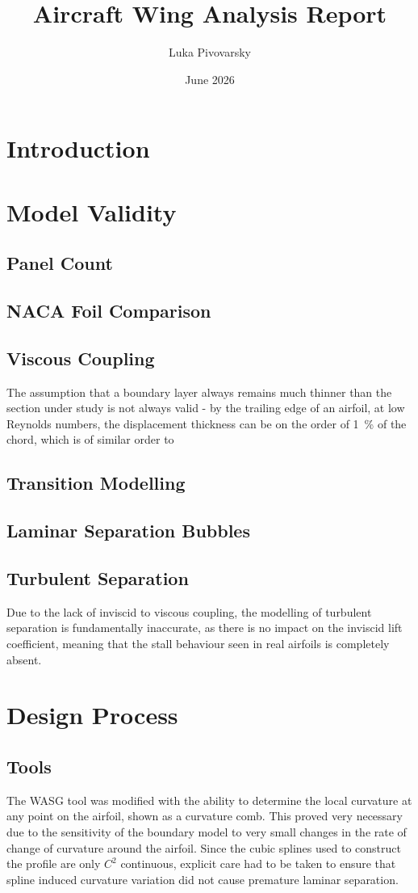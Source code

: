 \documentclass[12pt]{article}
\title{Aircraft Wing Analysis Report}
\author{Luka Pivovarsky}
\date{June 2026}
\begin{document}
\maketitle

\section{Introduction}
\section{Model Validity}
\subsection{Panel Count}
\subsection{NACA Foil Comparison}
\subsection{Viscous Coupling}
The assumption that a boundary layer always remains much thinner than the section under study is not always valid - by the trailing edge of an airfoil, at low Reynolds numbers, the displacement thickness can be on the order of \qty{1}{\percent} of the chord, which is of similar order to 
\subsection{Transition Modelling}
\subsection{Laminar Separation Bubbles}
\subsection{Turbulent Separation}
Due to the lack of inviscid to viscous coupling, the modelling of turbulent separation is fundamentally inaccurate, as there is no impact on the inviscid lift coefficient, meaning that the stall behaviour seen in real airfoils is completely absent. 
\section{Design Process}
\subsection{Tools}
The WASG tool was modified with the ability to determine the local curvature at any point on the airfoil, shown as a curvature comb. This proved very necessary due to the sensitivity of the boundary model to very small changes in the rate of change of curvature around the airfoil. Since the cubic splines used to construct the profile are only $C^2$ continuous, explicit care had to be taken to ensure that spline induced curvature variation did not cause premature laminar separation.
\end{document}
